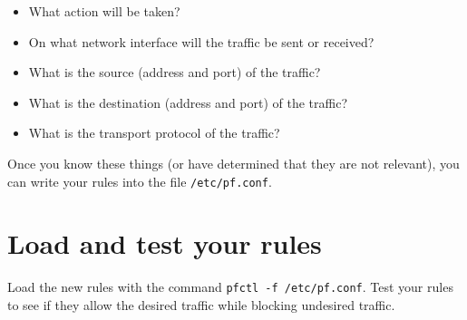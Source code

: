 \documentclass{article}
\begin{document}
\begin{itemize}
	\item What action will be taken?
	\item On what network interface will the traffic be sent or received?
	\item What is the source (address and port) of the traffic?
	\item What is the destination (address and port) of the traffic?
	\item What is the transport protocol of the traffic?
\end{itemize}

Once you know these things (or have determined that they are not relevant), you can write your rules into the file \texttt{/etc/pf.conf}.

\section{Load and test your rules}
Load the new rules with the command \texttt{pfctl -f /etc/pf.conf}.  Test your rules to see if they allow the desired traffic while blocking undesired traffic.
\end{document}
